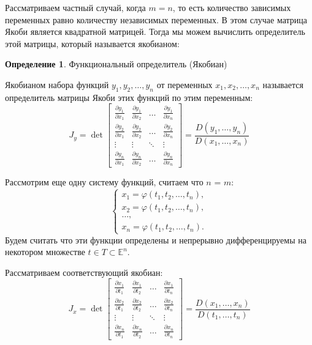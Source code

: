 \documentclass{article}
\theoremstyle{plain}
\theoremstyle{definition}
\newtheorem{definition}{Определение}
\theoremstyle{remark}
\begin{document}
Рассматриваем частный случай, когда $m = n$, то есть количество зависимых переменных равно количеству независимых переменных.
В этом случае матрица Якоби является квадратной матрицей. Тогда мы можем
вычислить определитель этой матрицы, который называется якобианом:
\begin{definition}{Функциональный определитель (Якобиан)}

Якобианом набора функций $y_1, y_2, \ldots, y_n$ от переменных
$x_1, x_2, \ldots, x_n$ называется определитель матрицы Якоби этих функций по этим переменным:
    \begin{equation}
        J_y = \det \begin{bmatrix}
            \frac{\partial y_1}{\partial x_1} & \frac{\partial y_1}{\partial x_2} & \ldots & \frac{\partial y_1}{\partial x_n} \\
            \frac{\partial y_2}{\partial x_1} & \frac{\partial y_2}{\partial x_2} & \ldots & \frac{\partial y_2}{\partial x_n} \\
            \vdots & \vdots & \ddots & \vdots \\
            \frac{\partial y_n}{\partial x_1} & \frac{\partial y_n}{\partial x_2} & \ldots & \frac{\partial y_n}{\partial x_n}
        \end{bmatrix} = \frac{D(y_1, \ldots, y_n)}{D(x_1, \ldots, x_n)}
    \end{equation}
\end{definition}

Рассмотрим еще одну систему функций, считаем что $n$ = $m$:
\begin{equation}
    \begin{cases}
        x_1 = \varphi(t_1, t_2, \ldots, t_n), \\
        x_2 = \varphi(t_1, t_2, \ldots, t_n), \\
        \ldots, \\
        x_n = \varphi(t_1, t_2, \ldots, t_n).
    \end{cases}
\end{equation}
Будем считать что эти функции определены и непрерывно дифференцируемы
на некотором множестве $t \in T \subset \mathbb{E}^n$.

Рассматриваем соответствующий якобиан:
\begin{equation}
    J_x = \det \begin{bmatrix}
        \frac{\partial x_1}{\partial t_1} & \frac{\partial x_1}{\partial t_2} & \ldots & \frac{\partial x_1}{\partial t_n} \\
        \frac{\partial x_2}{\partial t_1} & \frac{\partial x_2}{\partial t_2} & \ldots & \frac{\partial x_2}{\partial t_n} \\
        \vdots & \vdots & \ddots & \vdots \\
        \frac{\partial x_n}{\partial t_1} & \frac{\partial x_n}{\partial t_2} & \ldots & \frac{\partial x_n}{\partial t_n}
    \end{bmatrix} = \frac{D(x_1, \ldots, x_n)}{D(t_1, \ldots, t_n)}
\end{equation}
\end{document}

